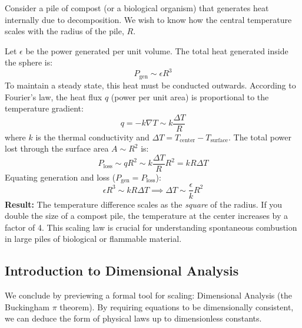 Consider a pile of compost (or a biological organism) that generates heat internally due to decomposition. We wish to know how the central temperature scales with the radius of the pile, $R$.

Let $\epsilon$ be the power generated per unit volume. The total heat generated inside the sphere is:
\[
    P_\text{gen} \sim \epsilon R^3
\]
To maintain a steady state, this heat must be conducted outwards. According to Fourier's law, the heat flux $q$ (power per unit area) is proportional to the temperature gradient:
\[
    q = -k \nabla T \sim k \frac{\Delta T}{R}
\]
where $k$ is the thermal conductivity and $\Delta T = T_\text{center} - T_\text{surface}$. 
The total power lost through the surface area $A \sim R^2$ is:
\[
    P_\text{loss} \sim q R^2 \sim k \frac{\Delta T}{R} R^2 = k R \Delta T
\]
Equating generation and loss ($P_\text{gen} = P_\text{loss}$):
\[
    \epsilon R^3 \sim k R \Delta T \implies \Delta T \sim \frac{\epsilon}{k} R^2
\]
\textbf{Result:} The temperature difference scales as the \emph{square} of the radius. If you double the size of a compost pile, the temperature at the center increases by a factor of 4. This scaling law is crucial for understanding spontaneous combustion in large piles of biological or flammable material.

\subsection{Introduction to Dimensional Analysis}

We conclude by previewing a formal tool for scaling: Dimensional Analysis (the Buckingham $\pi$ theorem). By requiring equations to be dimensionally consistent, we can deduce the form of physical laws up to dimensionless constants.


